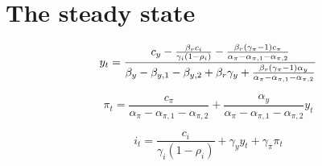 \documentclass{article}
\begin{document}
\section{The steady state}

\[
y_{t}=\frac{c_{y}-\frac{\beta _{r}c_{i}}{\gamma _{i}\left( 1-\rho
_{i}\right) }-\frac{\beta _{r}\left( \gamma _{\pi }-1\right) c_{\pi }}{%
\alpha _{\pi }-\alpha _{\pi ,1}-\alpha _{\pi ,2}}}{\beta _{y}-\beta
_{y,1}-\beta _{y,2}+\beta _{r}\gamma _{y}+\frac{\beta _{r}\left( \gamma
_{\pi }-1\right) \alpha _{y}}{\alpha _{\pi }-\alpha _{\pi ,1}-\alpha _{\pi
,2}}}
\]

\[
\pi _{t}=\frac{c_{\pi }}{\alpha _{\pi }-\alpha _{\pi ,1}-\alpha _{\pi ,2}}+%
\frac{\alpha _{y}}{\alpha _{\pi }-\alpha _{\pi ,1}-\alpha _{\pi ,2}}y_{t}
\]

\[
i_{t}=\frac{c_{i}}{\gamma _{i}\left( 1-\rho _{i}\right) }+\gamma
_{y}y_{t}+\gamma _{\pi }\pi _{t}
\]
\end{document}
